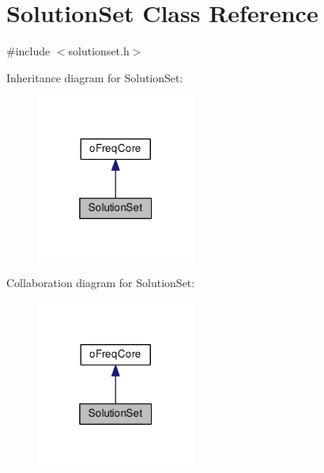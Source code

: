 \hypertarget{class_solution_set}{\section{Solution\-Set Class Reference}
\label{class_solution_set}
}


{\ttfamily \#include $<$solutionset.\-h$>$}



Inheritance diagram for Solution\-Set\-:\nopagebreak
\begin{figure}[H]
\begin{center}
\leavevmode
\includegraphics[width=148pt]{class_solution_set__inherit__graph}
\end{center}
\end{figure}


Collaboration diagram for Solution\-Set\-:\nopagebreak
\begin{figure}[H]
\begin{center}
\leavevmode
\includegraphics[width=148pt]{class_solution_set__coll__graph}
\end{center}
\end{figure}

